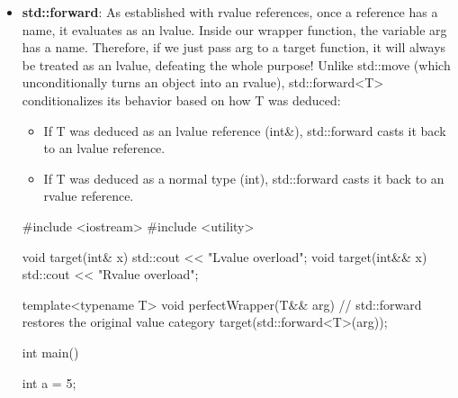 \documentclass{report}
\begin{document}
\begin{itemize}
\begin{cppcode}
                wrapper(20); // 1. You pass an rvalue (20).
                // 2. Compiler deduces T as 'int'.
                // 3. Substituting T gives: 'int&& arg' (an rvalue reference!)
            \end{cppcode}
        \item \textbf{std::forward}: As established with rvalue references, once a reference has a name, it evaluates as an lvalue. Inside our wrapper function, the variable arg has a name. Therefore, if we just pass arg to a target function, it will always be treated as an lvalue, defeating the whole purpose!
            \bigbreak \noindent 
            Unlike std::move (which unconditionally turns an object into an rvalue), std::forward<T> conditionalizes its behavior based on how T was deduced:
            \begin{itemize}
                \item If T was deduced as an lvalue reference (int\&), std::forward casts it back to an lvalue reference.
                \item If T was deduced as a normal type (int), std::forward casts it back to an rvalue reference.
            \end{itemize}
            \bigbreak \noindent 
            \begin{cppcode}
                #include <iostream>
                #include <utility>

                void target(int& x) { std::cout << "Lvalue overload\n"; }
                void target(int&& x) { std::cout << "Rvalue overload\n"; }

                template<typename T>
                void perfectWrapper(T&& arg) {
                    // std::forward restores the original value category
                    target(std::forward<T>(arg)); 
                }

                int main() {
                    int a = 5;

}
\end{cppcode}
\end{itemize}
\end{document}
